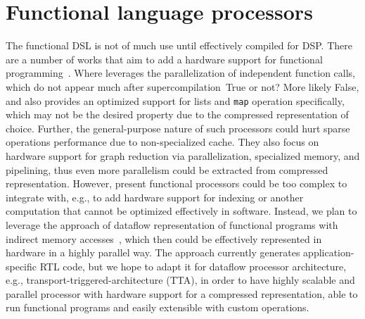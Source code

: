 \documentclass[10pt,conference]{IEEEtran}
\newcommand\todo[1]{{\color{red}#1}}
\begin{document}
\section{Functional language processors}
The functional DSL is not of much use until effectively compiled for DSP.  
There are a number of works that aim to add a hardware support for functional programming~\cite{ACqua,Reduceron,PILGRIM}. Where \cite{ACqua} leverages the parallelization of independent function calls, which do not appear much after supercompilation~\todo{True or not? More likely False}, and also
provides an optimized support for lists and \texttt{map} operation specifically, which may not be the desired property due to the compressed representation of choice. Further, the general-purpose nature of such processors could hurt sparse operations performance due to non-specialized cache.
They also focus on hardware support for graph reduction via parallelization, specialized memory, and pipelining, thus even more parallelism could be extracted from compressed representation.
However, present functional processors could be too complex to integrate with, e.g., to add hardware support for indexing or another computation that cannot be optimized effectively in software. 
Instead, we plan to leverage the approach of dataflow representation of functional programs with indirect memory accesses~\cite{funcHLS}, which then could be effectively represented in hardware in a highly parallel way. 
The approach currently generates application-specific RTL code, but we hope to adapt it for dataflow processor architecture, e.g., transport-triggered-architecture (TTA), in order to have highly scalable and parallel processor with hardware support for a compressed representation, able to run functional programs and easily extensible with custom operations. 


\end{document}
